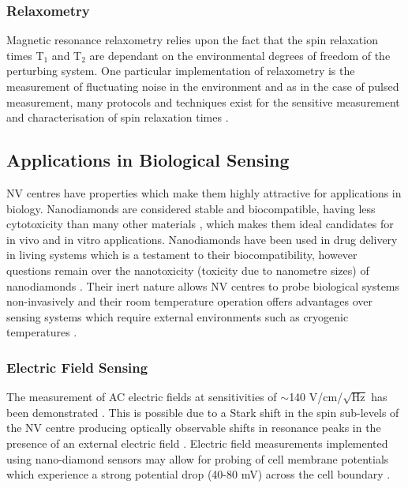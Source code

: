 \documentclass[10pt]{article}
\begin{document}
\begin{multicols}{2}
\subsubsection{Relaxometry}
Magnetic resonance relaxometry relies upon the fact that the spin relaxation times T$_1$ and T$_2$ are dependant on the environmental degrees of freedom of the perturbing system. One particular implementation of relaxometry is the measurement of fluctuating noise in the environment and as in the case of pulsed measurement, many protocols and techniques exist for the sensitive measurement and characterisation of spin relaxation times \cite{steinert2013magnetic}.


\subsection{Applications in Biological Sensing}
NV centres have properties which make them highly attractive for applications in biology. Nanodiamonds are considered stable and biocompatible, having less cytotoxicity than many other materials \cite{vaijayanthimala2012long,schrand2007differential}, which makes them ideal candidates for in vivo and in vitro applications. Nanodiamonds have been used in drug delivery in living systems \cite{huang2007active} which is a testament to their biocompatibility, however questions remain over the nanotoxicity (toxicity due to nanometre sizes) of nanodiamonds \cite{schrand2007differential}. Their inert nature allows NV centres to probe biological systems non-invasively and their room temperature operation offers advantages over sensing systems which require external environments such as cryogenic temperatures \cite{wu2016diamond}. 

\subsubsection{Electric Field Sensing}
The measurement of AC electric fields at sensitivities of $\sim$140 V/cm/$\sqrt{\textrm{Hz}}$ has been demonstrated \cite{dolde2011electric}. This is possible due to a Stark shift in the spin sub-levels of the NV centre producing optically observable shifts in resonance peaks in the presence of an external electric field \cite{dolde2011electric}. Electric field measurements implemented using nano-diamond sensors may allow for probing of cell membrane potentials which experience a strong potential drop (40-80 mV) across the cell boundary \cite{schirhagl2014nitrogen}.


\end{multicols}
\end{document}
